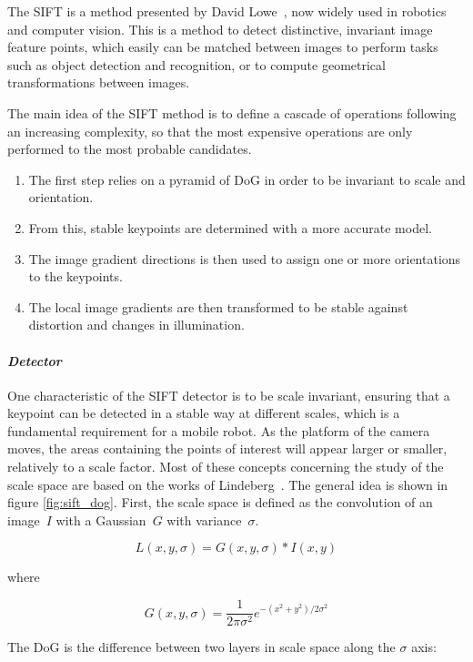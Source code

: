 The \gls{SIFT} is a method presented by David Lowe~\cite{lowe_2004_sift}, now widely used in robotics and computer vision.
This is a method to detect distinctive, invariant image feature points, which easily can be matched between images to perform tasks such as object detection and recognition, or to compute geometrical transformations between images.

The main idea of the \gls{SIFT} method is to define a cascade of operations following an increasing complexity, so that the most expensive operations are only performed to the most probable candidates.
\begin{enumerate}
\item The first step relies on a pyramid of \gls{DoG} in order to be invariant to scale and orientation.
\item From this, stable keypoints are determined with a more accurate model.
\item The image gradient directions is then used to assign one or more orientations to the keypoints.
\item The local image gradients are then transformed to be stable against distortion and changes in illumination.
\end{enumerate}

\clearpage
\paragraph{\emph{Detector}}

One characteristic of the SIFT detector is to be scale invariant, ensuring that a keypoint can be detected in a stable way at different scales, which is a fundamental requirement for a mobile robot. As the platform of the camera moves, the areas containing the points of interest will appear larger or smaller, relatively to a scale factor. Most of these concepts concerning the study of the scale space are based on the works of Lindeberg~\cite{Lindeberg_1994}. The general idea is shown in figure \ref{fig:sift_dog}. First, the scale space is defined as the convolution of an image~$I$ with a Gaussian~$G$ with variance~$\sigma$.

\[ L(x,y,\sigma) = G(x,y,\sigma) * I(x,y) \]

where

\[ G(x,y,\sigma) = \frac{1}{2\pi\sigma^2}e^{-{(x^2+y^2)/2\sigma^2}} \]


The \gls{DoG} is the difference between two layers in scale space along the $\sigma$ axis:

